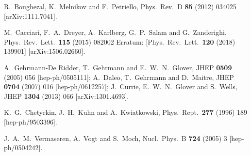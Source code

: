 \documentclass[12pt]{article}
\begin{document}
\begin{thebibliography}{99}
  R.~Boughezal, K.~Melnikov and F.~Petriello,
  Phys.\ Rev.\ D {\bf 85} (2012) 034025
  [arXiv:1111.7041].


  M.~Cacciari, F.~A.~Dreyer, A.~Karlberg, G.~P.~Salam and G.~Zanderighi,
  Phys.\ Rev.\ Lett.\  {\bf 115} (2015) 082002
  Erratum: [Phys.\ Rev.\ Lett.\  {\bf 120} (2018)  139901]
  [arXiv:1506.02660].



  A.~Gehrmann-De Ridder, T.~Gehrmann and E.~W.~N.~Glover,
  JHEP {\bf 0509} (2005) 056
  [hep-ph/0505111];
  A.~Daleo, T.~Gehrmann and D.~Maitre,
  JHEP {\bf 0704} (2007) 016
  [hep-ph/0612257];
  J.~Currie, E.~W.~N.~Glover and S.~Wells,
  JHEP {\bf 1304} (2013) 066
  [arXiv:1301.4693].
  






  K.~G.~Chetyrkin, J.~H.~Kuhn and A.~Kwiatkowski,
  Phys.\ Rept.\  {\bf 277} (1996) 189
   [hep-ph/9503396].


  J.~A.~M.~Vermaseren, A.~Vogt and S.~Moch,
  Nucl.\ Phys.\ B {\bf 724} (2005) 3
  [hep-ph/0504242].


\end{thebibliography}
\end{document}

